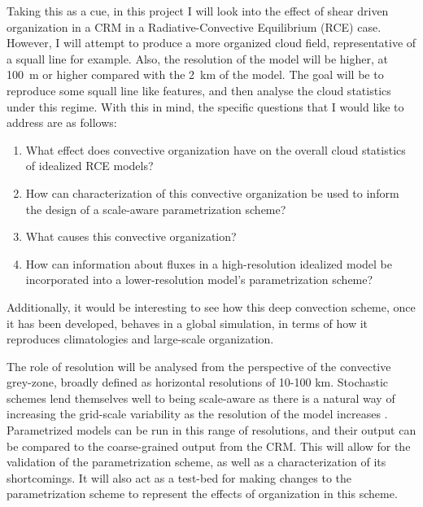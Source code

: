 \documentclass[11pt,a4paper]{article}
\begin{document}
Taking this as a cue, in this project I will look into the effect of shear driven organization in a CRM in a Radiative-Convective Equilibrium (RCE) case. However, I will attempt to produce a more organized cloud field, representative of a squall line for example. Also, the resolution of the model will be higher, at \SI{100}{m} or higher compared with the \SI{2}{km} of the \cite{cohen2006fluctuations} model. The goal will be to reproduce some squall line like features, and then analyse the cloud statistics under this regime. With this in mind, the specific questions that I would like to address are as follows:

\begin{enumerate}
    \item What effect does convective organization have on the overall cloud statistics of idealized RCE models?
    \item How can characterization of this convective organization be used to inform the design of a scale-aware parametrization scheme?
    \item What causes this convective organization?
    \item How can information about fluxes in a high-resolution idealized model be incorporated into a lower-resolution model's parametrization scheme?
\end{enumerate}

Additionally, it would be interesting to see how this deep convection scheme, once it has been developed, behaves in a global simulation, in terms of how it reproduces climatologies and large-scale organization.

The role of resolution will be analysed from the perspective of the convective grey-zone, broadly defined as horizontal resolutions of 10-100 km. Stochastic schemes lend themselves well to being scale-aware as there is a natural way of increasing the grid-scale variability as the resolution of the model increases \parencite{plant2008stochastic, sakradzija2016stochastic}. Parametrized models can be run in this range of resolutions, and their output can be compared to the coarse-grained output from the CRM. This will allow for the validation of the parametrization scheme, as well as a characterization of its shortcomings. It will also act as a test-bed for making changes to the parametrization scheme to represent the effects of organization in this scheme. 


\end{document}
